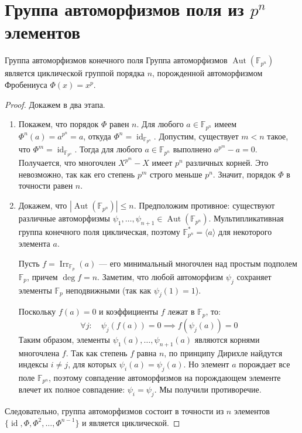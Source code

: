 
\section{Группа автоморфизмов поля из $p^n$ элементов}

\begin{Theorem}{Группа автоморфизмов конечного поля}{}
	Группа автоморфизмов $\operatorname{Aut}(\mathbb{F}_{p^n})$ является циклической группой порядка $n$, порожденной автоморфизмом Фробениуса $\Phi(x) = x^p$.
\end{Theorem}

\begin{proof}
	Докажем в два этапа.
	\begin{enumerate}
		\item Покажем, что порядок $\Phi$ равен $n$.
		Для любого $a \in \mathbb{F}_{p^n}$ имеем $\Phi^n(a) = a^{p^n} = a$, откуда $\Phi^n = \operatorname{id}_{\mathbb{F}_{p^n}}$.
		Допустим, существует $m < n$ такое, что $\Phi^m = \operatorname{id}_{\mathbb{F}_{p^n}}$. Тогда для любого $a \in \mathbb{F}_{p^n}$ выполнено $a^{p^m} - a = 0$.
		Получается, что многочлен $X^{p^m} - X$ имеет $p^n$ различных корней. Это невозможно, так как его степень $p^m$ строго меньше $p^n$. Значит, порядок $\Phi$ в точности равен $n$.

		\item Докажем, что $|\operatorname{Aut}(\mathbb{F}_{p^n})| \le n$.
		Предположим противное: существуют различные автоморфизмы $\psi_1, \dots, \psi_{n+1} \in \operatorname{Aut}(\mathbb{F}_{p^n})$. Мультипликативная группа конечного поля циклическая, поэтому $\mathbb{F}_{p^n}^* = \langle a \rangle$ для некоторого элемента $a$.

		Пусть $f = \operatorname{Irr}_{\mathbb{F}_p}(a)$ --- его минимальный многочлен над простым подполем $\mathbb{F}_p$, причем $\deg f = n$. Заметим, что любой автоморфизм $\psi_j$ сохраняет элементы $\mathbb{F}_p$ неподвижными (так как $\psi_j(1)=1$).

		Поскольку $f(a) = 0$ и коэффициенты $f$ лежат в $\mathbb{F}_p$, то:
		\[ \forall j : \quad \psi_j(f(a)) = 0 \implies f(\psi_j(a)) = 0 \]
		Таким образом, элементы $\psi_1(a), \dots, \psi_{n+1}(a)$ являются корнями многочлена $f$. Так как степень $f$ равна $n$, по принципу Дирихле найдутся индексы $i \neq j$, для которых $\psi_i(a) = \psi_j(a)$.
		Но элемент $a$ порождает все поле $\mathbb{F}_{p^n}$, поэтому совпадение автоморфизмов на порождающем элементе влечет их полное совпадение: $\psi_i = \psi_j$. Мы получили противоречие.
	\end{enumerate}
	Следовательно, группа автоморфизмов состоит в точности из $n$ элементов $\{\operatorname{id}, \Phi, \Phi^2, \dots, \Phi^{n-1}\}$ и является циклической.
\end{proof}

